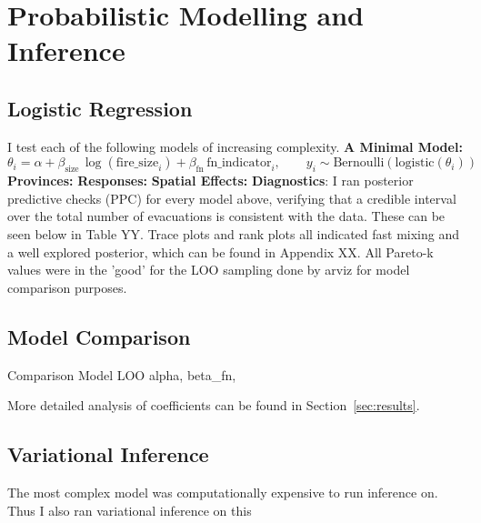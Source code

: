 \section{Probabilistic Modelling and Inference}\label{sec:modelling}
\subsection{Logistic Regression}\label{sec:first_model}
I test each of the following models of increasing complexity.
\textbf{A Minimal Model:}
\[\theta_i
=
\alpha
+ \beta_{\text{size}} \, \log(\text{fire\_size}_i)
+ \beta_{\text{fn}} \, \text{fn\_indicator}_i,
\qquad
y_i \sim \mathrm{Bernoulli}\!\left(\mathrm{logistic}(\theta_i)\right)\]
\textbf{Provinces:}
\textbf{Responses:}
\textbf{Spatial Effects:}
\textbf{Diagnostics}: I ran posterior predictive checks (PPC) for every model above, verifying that a credible interval over the  total number of evacuations is consistent with the data. These can be seen below in Table YY. Trace plots and rank plots all indicated fast mixing and a well explored posterior, which can be found in Appendix XX. All Pareto-k values were in the 'good' for the LOO sampling done by arviz for model comparison purposes.
\subsection{Model Comparison}\label{sec:model_comparison}
Comparison
Model LOO alpha, beta\_fn, 

More detailed analysis of coefficients can be found in Section~\ref{sec:results}.

\subsection{Variational Inference}
The most complex model was computationally expensive to run inference on. Thus I also ran variational inference on this